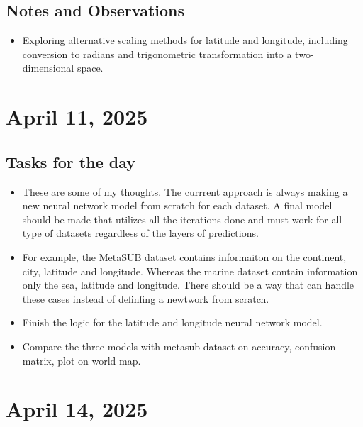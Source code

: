 \documentclass{article}
\begin{document}
\subsection*{Notes and Observations}
\begin{itemize}
    \item Exploring alternative scaling methods for latitude and longitude, including conversion to radians and trigonometric transformation into a two-dimensional space.
\end{itemize}

\section{April 11, 2025}
\subsection*{Tasks for the day}
\begin{itemize}
    \item These are some of my thoughts. The currrent approach is always making a new neural network model from scratch for each dataset. A final model should be made 
    that utilizes all the iterations done and must work for all type of datasets regardless of the layers of predictions. 
    \item For example, the MetaSUB dataset contains informaiton on the continent, city, latitude and longitude. Whereas the marine dataset contain information only the sea, latitude and longitude.
    There should be a way that can handle these cases instead of definfing a newtwork from scratch.
    \item Finish the logic for the latitude and longitude neural network model. 
    \item Compare the three models with metasub dataset on accuracy, confusion matrix, plot on world map.
\end{itemize}

\section{April 14, 2025}
\end{document}
